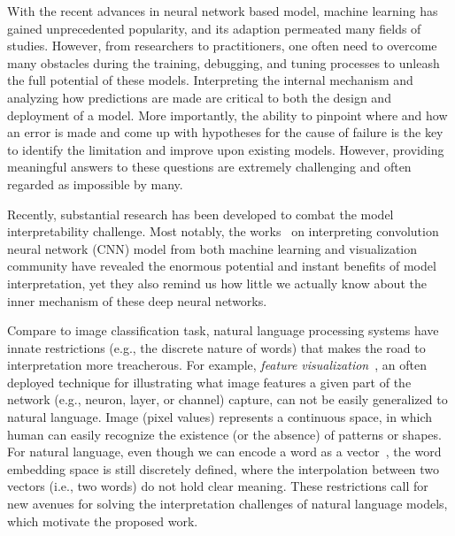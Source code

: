 \maketitle

With the recent advances in neural network based model, machine learning has gained unprecedented popularity, and its adaption permeated many fields of studies.
%
However, from researchers to practitioners, one often need to overcome many obstacles during the training, debugging, and tuning processes to unleash the full potential of these models.
%
Interpreting the internal mechanism and analyzing how predictions are made are critical to both the design and deployment of a model.
More importantly, the ability to pinpoint where and how an error is made and come up with hypotheses for the cause of failure is the key to identify the limitation and improve upon existing models.
However, providing meaningful answers to these questions are extremely challenging and often regarded as impossible by many.

Recently, substantial research has been developed to combat the model interpretability challenge. Most notably, the works~\cite{SimonyanVedaldiZisserman2013, ZeilerFergus2014, YosinskiCluneNguyen2015, OlahMordvintsevSchubert2017, LiuShiLi2017, OlahSatyanarayanJohnson2018, BilalJourablooYe2018} on interpreting convolution neural network (CNN) model from both machine learning and visualization community have revealed the enormous potential and instant benefits of model interpretation, yet they also remind us how little we actually know about the inner mechanism of these deep neural networks.

Compare to image classification task, natural language processing systems have innate restrictions (e.g., the discrete nature of words) that makes the road to interpretation more treacherous. For example, \emph{feature visualization}~\cite{OlahMordvintsevSchubert2017}, an often deployed technique for illustrating what image features a given part of the network (e.g., neuron, layer, or channel) capture, can not be easily generalized to natural language. Image (pixel values) represents a continuous space, in which human can easily recognize the existence (or the absence) of patterns or shapes. For natural language, even though we can encode a word as a vector~\cite{MikolovSutskeverChen2013, PenningtonSocherManning2014}, the word embedding space is still discretely defined, where the interpolation between two vectors (i.e., two words) do not hold clear meaning.
%
These restrictions call for new avenues for solving the interpretation challenges of natural language models, which motivate the proposed work.

